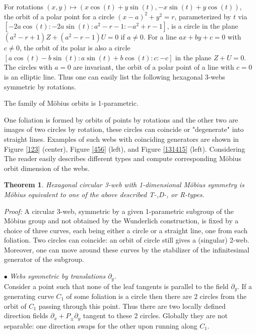 \documentclass[11pt,a4paper]{article}
\newtheorem{theorem}{Theorem}
\begin{document}
\noindent For  rotations  $(x,y)\mapsto (x\cos(t)+y\sin(t),-x\sin(t)+y\cos(t))$, the orbit of a polar point for  a circle $(x-a)^2+y^2=r$,  parameterized  by $t$ via $[-2a\cos(t):-2a\sin(t): a^2-r-1: -a^2+r-1]$, is a circle in the plane $(a^2-r+1)Z+(a^2-r-1)U=0$ if $a\ne 0$.  For a  line $ax+by+c=0$ with $c\ne 0$, the orbit of its polar is also a circle $[a\cos(t)-b\sin(t):a\sin(t)+b\cos(t):c:-c]$ in the plane $Z+U=0$. The circles with $a=0$ are invariant, the orbit of a polar point of a line with $c=0$ is an elliptic line. 
Thus one can easily list the following hexagonal 3-webs symmetric by rotations.


\bigskip
{}

\noindent The family of M\"obius orbits is 1-parametric. 

\bigskip
{}

\noindent One foliation is formed by orbits of points by rotations and the other two are images of two circles by rotation, these circles can coincide or "degenerate" into straight lines. Examples of such webs with coinciding generators are shown in Figure \ref{123} (center), Figure \ref{456} (left), and Figure \ref{131415} (left). Considering The reader easily describes different types and compute corresponding M\"obius orbit dimension of the webs.   

  

\begin{theorem}
Hexagonal circular 3-web with 1-dimensional Möbius symmetry is M\"obius equivalent to one of the above described T-,D-, or R-types.
\end{theorem}
{\it Proof:} A circular 3-web, symmetric by a given 1-parametric subgroup of the Möbius group and not obtained by the Wunderlich construction, is fixed by a choice of  three curves, each being either a circle or a straight line, one from each foliation. Two circles can coincide: an orbit of circle still gives a (singular) 2-web.   Moreover, one can move around these curves by the stabilizer of the infinitesimal generator of the subgroup. 



$\bullet${ \it Webs symmetric by translations $\partial_y$}.\\  
Consider a  point  such that none of the leaf tangents is parallel to the field $\partial_y$. If a generating curve $C_1$ of some foliation is a circle then there  are 2 circles from the orbit of $C_1$ passing through this point. Thus there are two  locally defined direction fields $\partial_x+P_{\pm}\partial_y$  tangent to these 2 circles. Globally they are not separable: one direction swaps for the other upon running along $C_1$.     
\end{document}
